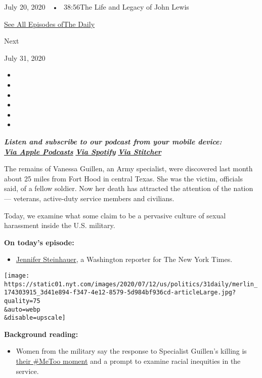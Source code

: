 July 20, 2020~~•~ 38:56The Life and Legacy of John Lewis

\href{https://www.nytimes.com/column/the-daily}{See All Episodes ofThe
Daily}

Next

July 31, 2020

\begin{itemize}
\item
\item
\item
\item
\item
\item
\end{itemize}

\emph{\textbf{Listen and subscribe to our podcast from your mobile
device:}}\\
\textbf{\href{https://itunes.apple.com/us/podcast/the-daily/id1200361736?mt=2}{\emph{Via
Apple Podcasts}}} \emph{\textbf{\textbar{}}}
\textbf{\href{https://open.spotify.com/show/3IM0lmZxpFAY7CwMuv9H4g?si=SfuMSC55R1qprFsRZU3_zw}{\emph{Via
Spotify}}} \emph{\textbf{\textbar{}}}
\textbf{\href{http://www.stitcher.com/podcast/the-new-york-times/the-daily-10}{\emph{Via
Stitcher}}}

The remains of Vanessa Guillen, an Army specialist, were discovered last
month about 25 miles from Fort Hood in central Texas. She was the
victim, officials said, of a fellow soldier. Now her death has attracted
the attention of the nation --- veterans, active-duty service members
and civilians.

Today, we examine what some claim to be a pervasive culture of sexual
harassment inside the U.S. military.

\textbf{On today's episode:}

\begin{itemize}
\tightlist
\item
  \href{https://www.nytimes.com/by/jennifer-steinhauer}{Jennifer
  Steinhauer}, a Washington reporter for The New York Times.
\end{itemize}

\texttt{[image: https://static01.nyt.com/images/2020/07/12/us/politics/31daily/merlin\_174303915\_3d41e894-f347-4e12-8579-5d984bf936cd-articleLarge.jpg?quality=75\\\&auto=webp\\\&disable=upscale]}

\textbf{Background reading:}

\begin{itemize}
\tightlist
\item
  Women from the military say the response to Specialist Guillen's
  killing is
  \href{https://www.nytimes.com/2020/07/11/us/politics/military-women-metoo-fort-hood.html}{their
  \#MeToo moment} and a prompt to examine racial inequities in the
  service.
\end{itemize}

